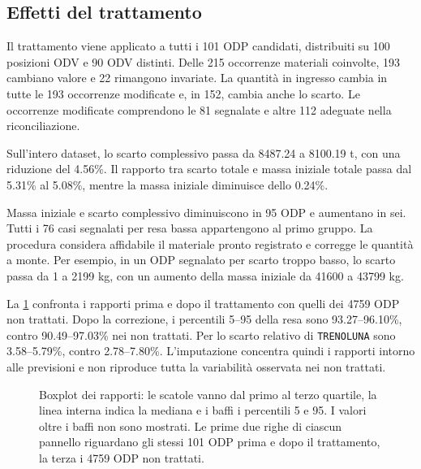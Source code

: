 \subsection{Effetti del trattamento}
\label{sec:mass-imputation-results}

Il trattamento viene applicato a tutti i 101 ODP candidati, distribuiti su 100 posizioni ODV e 90 ODV distinti. Delle 215 occorrenze materiali coinvolte, 193 cambiano valore e 22 rimangono invariate. La quantità in ingresso cambia in tutte le 193 occorrenze modificate e, in 152, cambia anche lo scarto. Le occorrenze modificate comprendono le 81 segnalate e altre 112 adeguate nella riconciliazione.



Sull'intero dataset, lo scarto complessivo passa da \num{8487.24} a \num{8100.19} t, con una riduzione del \num{4.56}\%. Il rapporto tra scarto totale e massa iniziale totale passa dal \num{5.31}\% al \num{5.08}\%, mentre la massa iniziale diminuisce dello \num{0.24}\%.

Massa iniziale e scarto complessivo diminuiscono in 95 ODP e aumentano in sei. Tutti i 76 casi segnalati per resa bassa appartengono al primo gruppo. La procedura considera affidabile il materiale pronto registrato e corregge le quantità a monte. Per esempio, in un ODP segnalato per scarto troppo basso, lo scarto passa da 1 a \num{2199} kg, con un aumento della massa iniziale da \num{41600} a \num{43799} kg.

La \cref{fig:mass-imputation-effects} confronta i rapporti prima e dopo il trattamento con quelli dei \num{4759} ODP non trattati. Dopo la correzione, i percentili 5--95 della resa sono \num{93.27}--\num{96.10}\%, contro \num{90.49}--\num{97.03}\% nei non trattati. Per lo scarto relativo di \texttt{TRENOLUNA} sono \num{3.58}--\num{5.79}\%, contro \num{2.78}--\num{7.80}\%. L'imputazione concentra quindi i rapporti intorno alle previsioni e non riproduce tutta la variabilità osservata nei non trattati.

\begin{figure}[H]
\centering
{}
\caption{Boxplot dei rapporti: le scatole vanno dal primo al terzo quartile, la linea interna indica la mediana e i baffi i percentili 5 e 95. I valori oltre i baffi non sono mostrati. Le prime due righe di ciascun pannello riguardano gli stessi 101 ODP prima e dopo il trattamento, la terza i \num{4759} ODP non trattati.}
\label{fig:mass-imputation-effects}
\end{figure}

